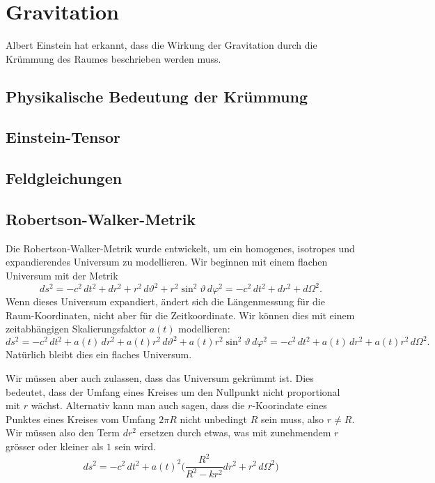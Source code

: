 %
%
%
\section{Gravitation%
\label{skript:kruemmung:sectipn:gravitation}}
Albert Einstein hat erkannt, dass die Wirkung der Gravitation 
durch die Krümmung des Raumes beschrieben werden muss.

\subsection{Physikalische Bedeutung der Krümmung}

\subsection{Einstein-Tensor}

\subsection{Feldgleichungen}



\subsection{Robertson-Walker-Metrik}
Die Robertson-Walker-Metrik wurde entwickelt, um ein homogenes,
isotropes und expandierendes Universum zu modellieren.
Wir beginnen mit einem flachen Universum mit der
Metrik
\[
ds^2
=
-c^2\,dt^2 + dr^2 + r^2\,d\vartheta^2 + r^2\sin^2\vartheta \,d\varphi^2
=
-c^2\,dt^2 + dr^2 + d\Omega^2.
\]
Wenn dieses Universum expandiert, ändert sich die Längenmessung für die
Raum-Koordinaten, nicht aber für die Zeitkoordinate.
Wir können dies mit einem zeitabhängigen Skalierungsfaktor $a(t)$ 
modellieren:
\[
ds^2
=
-c^2\,dt^2 + a(t)\,dr^2 + a(t)r^2\,d\vartheta^2 + a(t)r^2 \sin^2\vartheta\,d\varphi^2
=
-c^2\,dt^2 + a(t)\,dr^2 + a(t)r^2\,d\Omega^2.
\]
Natürlich bleibt dies ein flaches Universum.

Wir müssen aber auch zulassen, dass das Universum gekrümmt ist.
Dies bedeutet, dass der Umfang eines Kreises um den Nullpunkt
nicht proportional mit $r$ wächst.
Alternativ kann man auch sagen, dass die $r$-Koorindate eines Punktes 
eines Kreises vom Umfang $2\pi R$ nicht unbedingt $R$ sein muss, also
$r \ne R$.
Wir müssen also den Term $dr^2$ ersetzen durch etwas, was mit zunehmendem
$r$ grösser oder kleiner als $1$ sein wird.
\[
ds^2
=
-c^2\,dt^2
+ a(t)^2 \biggl(
\frac{R^2}{R^2-kr^2} dr^2
+
r^2\, d\Omega^2
\biggr)
\]

